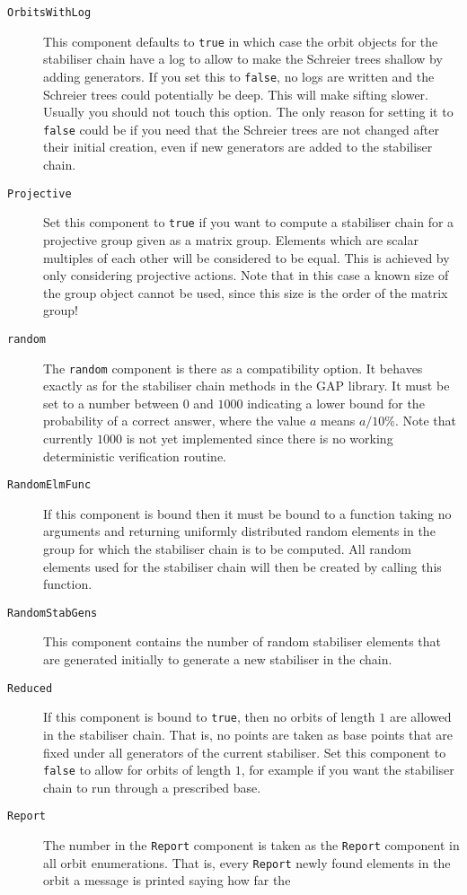\documentclass[a4paper,11pt]{report}
\begin{document}
{{\begin{description}
\item[{\texttt{OrbitsWithLog}}]  This component defaults to \texttt{true} in which case the orbit objects for the stabiliser chain have a log to allow
to make the Schreier trees shallow by adding generators. If you set this to \texttt{false}, no logs are written and the Schreier trees could potentially be deep. This
will make sifting slower. Usually you should not touch this option. The only
reason for setting it to \texttt{false} could be if you need that the Schreier trees are not changed after their
initial creation, even if new generators are added to the stabiliser chain. 
\item[{\texttt{Projective}}]  Set this component to \texttt{true} if you want to compute a stabiliser chain for a projective group given as a
matrix group. Elements which are scalar multiples of each other will be
considered to be equal. This is achieved by only considering projective
actions. Note that in this case a known size of the group object cannot be
used, since this size is the order of the matrix group! 
\item[{\texttt{random}}]  The \texttt{random} component is there as a compatibility option. It behaves exactly as for the
stabiliser chain methods in the \textsf{GAP} library. It must be set to a number between $0$ and $1000$ indicating a lower bound for the probability of a correct answer, where the
value $a$ means $a/10$\%. Note that currently $1000$ is not yet implemented since there is no working deterministic verification
routine. 
\item[{\texttt{RandomElmFunc}}]  If this component is bound then it must be bound to a function taking no
arguments and returning uniformly distributed random elements in the group for
which the stabiliser chain is to be computed. All random elements used for the
stabiliser chain will then be created by calling this function. 
\item[{\texttt{RandomStabGens}}]  This component contains the number of random stabiliser elements that are
generated initially to generate a new stabiliser in the chain. 
\item[{\texttt{Reduced}}]  If this component is bound to \texttt{true}, then no orbits of length $1$ are allowed in the stabiliser chain. That is, no points are taken as base
points that are fixed under all generators of the current stabiliser. Set this
component to \texttt{false} to allow for orbits of length $1$, for example if you want the stabiliser chain to run through a prescribed
base. 
\item[{\texttt{Report}}]  The number in the \texttt{Report} component is taken as the \texttt{Report} component in all orbit enumerations. That is, every \texttt{Report} newly found elements in the orbit a message is printed saying how far the

\end{description}}}
\end{document}
